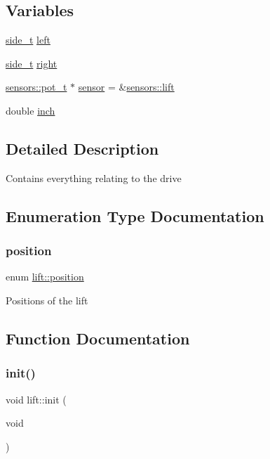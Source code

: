 \subsection*{Variables}
\begin{DoxyCompactItemize}
\item 
\hyperlink{structlift_1_1side__t}{side\+\_\+t} \hyperlink{namespacelift_acbf81adbb531b3d3f6d5b1ef946c81f7}{left}
\item 
\hyperlink{structlift_1_1side__t}{side\+\_\+t} \hyperlink{namespacelift_a62e75ece6036a2e9ef8c6edf92d668a1}{right}
\item 
\hyperlink{structsensors_1_1pot__t}{sensors\+::pot\+\_\+t} $\ast$ \hyperlink{namespacelift_af71770a66903080ec69dfc131240e214}{sensor} = \&\hyperlink{namespacesensors_aadc3d3ede9ae5dc9a3c25bf89a113268}{sensors\+::lift}
\item 
double \hyperlink{namespacelift_a3d44b39574f68db44182b8079f4fd5d0}{inch}
\end{DoxyCompactItemize}


\subsection{Detailed Description}
Contains everything relating to the drive 

\subsection{Enumeration Type Documentation}
\mbox{\label{namespacelift_a4a1c349e765b3b8489da50822876099d}} 
\subsubsection{\texorpdfstring{position}{position}}
{\footnotesize\ttfamily enum \hyperlink{namespacelift_a4a1c349e765b3b8489da50822876099d}{lift\+::position}}

Positions of the lift 

\subsection{Function Documentation}
\mbox{\label{namespacelift_af207a144f6c87583f4abbb9cb3f9838f}} 
\subsubsection{\texorpdfstring{init()}{init()}}
{\footnotesize\ttfamily void lift\+::init (\begin{DoxyParamCaption}\item[{void}]{ }\end{DoxyParamCaption})}

